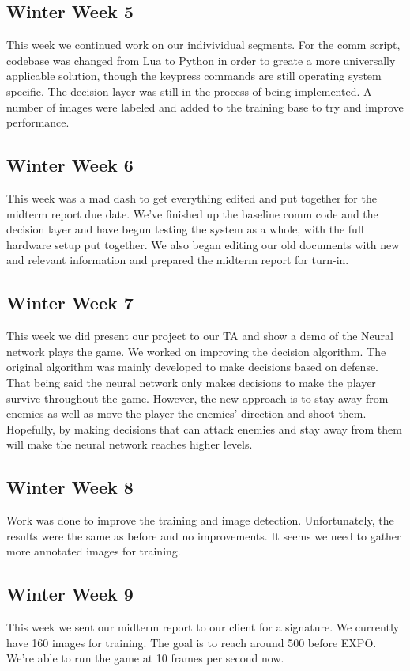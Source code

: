 \documentclass[onecolumn, draftclsnofoot,10pt, compsoc]{IEEEtran}
\begin{document}
\subsection{Winter Week 5}
This week we continued work on our indivividual segments. 
For the comm script, codebase was changed from Lua to Python in order to greate a more universally applicable solution, though the keypress commands are still operating system specific.
The decision layer was still in the process of being implemented.
A number of images were labeled and added to the training base to try and improve performance.

\subsection{Winter Week 6}
This week was a mad dash to get everything edited and put together for the midterm report due date.
We've finished up the baseline comm code and the decision layer and have begun testing the system as a whole, with the full hardware setup put together.
We also began editing our old documents with new and relevant information and prepared the midterm report for turn-in.

\subsection{Winter Week 7}
This week we did present our project to our TA and show a demo of the Neural network plays the game.
We worked on improving the decision algorithm.
The original algorithm was mainly developed to make decisions based on defense.
That being said the neural network only makes decisions to make the player survive throughout the game.
However, the new approach is to stay away from enemies as well as move the player the enemies’ direction and shoot them.
Hopefully, by making decisions that can attack enemies and stay away from them will make the neural network reaches higher levels.

\subsection{Winter Week 8}
Work was done to improve the training and image detection.
Unfortunately, the results were the same as before and no improvements.
It seems we need to gather more annotated images for training.

\subsection{Winter Week 9}
This week we sent our midterm report to our client for a signature.
We currently have 160 images for training.
The goal is to reach around 500 before EXPO.
We're able to run the game at 10 frames per second now.
\end{document}
